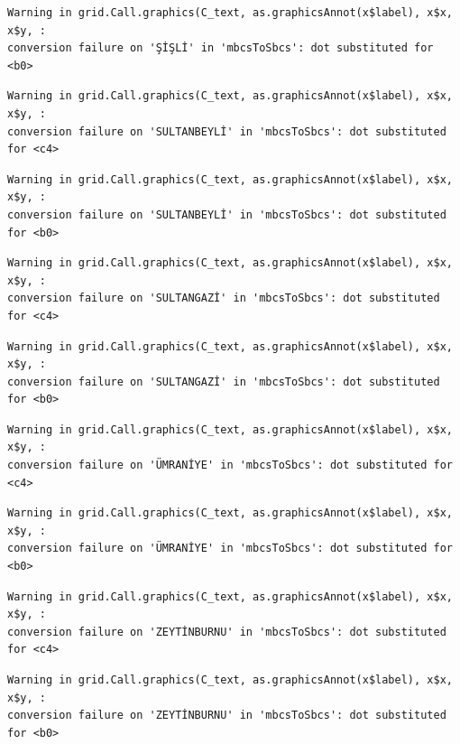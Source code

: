 \documentclass[
  11pt,
  a4paper,
  DIV=11,
  numbers=noendperiod]{scrartcl}
\begin{document}
\begin{verbatim}
Warning in grid.Call.graphics(C_text, as.graphicsAnnot(x$label), x$x, x$y, :
conversion failure on 'ŞİŞLİ' in 'mbcsToSbcs': dot substituted for <b0>
\end{verbatim}

\begin{verbatim}
Warning in grid.Call.graphics(C_text, as.graphicsAnnot(x$label), x$x, x$y, :
conversion failure on 'SULTANBEYLİ' in 'mbcsToSbcs': dot substituted for <c4>
\end{verbatim}

\begin{verbatim}
Warning in grid.Call.graphics(C_text, as.graphicsAnnot(x$label), x$x, x$y, :
conversion failure on 'SULTANBEYLİ' in 'mbcsToSbcs': dot substituted for <b0>
\end{verbatim}

\begin{verbatim}
Warning in grid.Call.graphics(C_text, as.graphicsAnnot(x$label), x$x, x$y, :
conversion failure on 'SULTANGAZİ' in 'mbcsToSbcs': dot substituted for <c4>
\end{verbatim}

\begin{verbatim}
Warning in grid.Call.graphics(C_text, as.graphicsAnnot(x$label), x$x, x$y, :
conversion failure on 'SULTANGAZİ' in 'mbcsToSbcs': dot substituted for <b0>
\end{verbatim}

\begin{verbatim}
Warning in grid.Call.graphics(C_text, as.graphicsAnnot(x$label), x$x, x$y, :
conversion failure on 'ÜMRANİYE' in 'mbcsToSbcs': dot substituted for <c4>
\end{verbatim}

\begin{verbatim}
Warning in grid.Call.graphics(C_text, as.graphicsAnnot(x$label), x$x, x$y, :
conversion failure on 'ÜMRANİYE' in 'mbcsToSbcs': dot substituted for <b0>
\end{verbatim}

\begin{verbatim}
Warning in grid.Call.graphics(C_text, as.graphicsAnnot(x$label), x$x, x$y, :
conversion failure on 'ZEYTİNBURNU' in 'mbcsToSbcs': dot substituted for <c4>
\end{verbatim}

\begin{verbatim}
Warning in grid.Call.graphics(C_text, as.graphicsAnnot(x$label), x$x, x$y, :
conversion failure on 'ZEYTİNBURNU' in 'mbcsToSbcs': dot substituted for <b0>
\end{verbatim}
\end{document}

